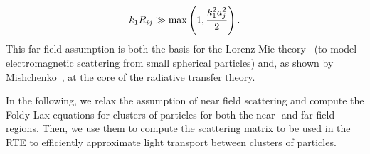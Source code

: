 %
\begin{equation}
    k_1 R_{ij} \gg \max\left(1, \frac{k_1^2a_j^2}{2}\right).
    \label{eq:farfield}
\end{equation}
%
This far-field assumption is both the basis for the Lorenz-Mie theory~\cite{hulst1981light} (to model electromagnetic scattering from small spherical particles) and, as shown by Mishchenko~, at the core of the radiative transfer theory.

In the following, we relax the assumption of near field scattering and compute the Foldy-Lax equations for clusters of particles for both the near- and far-field regions. Then, we use them to compute the scattering matrix to be used in the RTE to efficiently approximate light transport between clusters of particles. 
